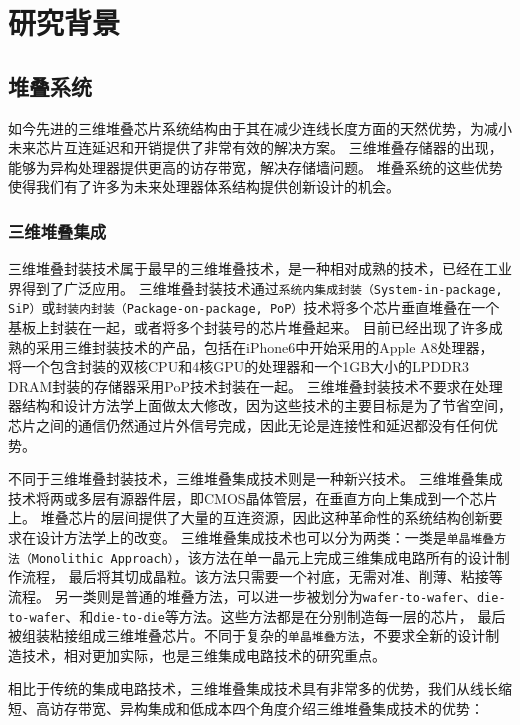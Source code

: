 \chapter{研究背景}
\label{chap:background}

\section{堆叠系统}

如今先进的三维堆叠芯片系统结构由于其在减少连线长度方面的天然优势，为减小未来芯片互连延迟和开销提供了非常有效的解决方案。
三维堆叠存储器的出现，能够为异构处理器提供更高的访存带宽，解决存储墙问题。
堆叠系统的这些优势使得我们有了许多为未来处理器体系结构提供创新设计的机会。

\subsection{三维堆叠集成}

三维堆叠封装技术属于最早的三维堆叠技术，是一种相对成熟的技术，已经在工业界得到了广泛应用。
三维堆叠封装技术通过\texttt{系统内集成封装（System-in-package, SiP）}或\texttt{封装内封装（Package-on-package, PoP）}技术将多个芯片垂直堆叠在一个基板上封装在一起，或者将多个封装号的芯片堆叠起来。
目前已经出现了许多成熟的采用三维封装技术的产品，包括在iPhone6中开始采用的Apple A8处理器，
将一个包含封装的双核CPU和4核GPU的处理器和一个1GB大小的LPDDR3 DRAM封装的存储器采用PoP技术封装在一起。
三维堆叠封装技术不要求在处理器结构和设计方法学上面做太大修改，因为这些技术的主要目标是为了节省空间，
芯片之间的通信仍然通过片外信号完成，因此无论是连接性和延迟都没有任何优势。

不同于三维堆叠封装技术，三维堆叠集成技术则是一种新兴技术。
三维堆叠集成技术将两或多层有源器件层，即CMOS晶体管层，在垂直方向上集成到一个芯片上。
堆叠芯片的层间提供了大量的互连资源，因此这种革命性的系统结构创新要求在设计方法学上的改变。
三维堆叠集成技术也可以分为两类：一类是\texttt{单晶堆叠方法（Monolithic Approach）}，该方法在单一晶元上完成三维集成电路所有的设计制作流程，
最后将其切成晶粒。该方法只需要一个衬底，无需对准、削薄、粘接等流程。
另一类则是普通的堆叠方法，可以进一步被划分为\texttt{wafer-to-wafer}、\texttt{die-to-wafer}、和\texttt{die-to-die}等方法。这些方法都是在分别制造每一层的芯片，
最后被组装粘接组成三维堆叠芯片。不同于复杂的\texttt{单晶堆叠方法}，不要求全新的设计制造技术，相对更加实际，也是三维集成电路技术的研究重点。


相比于传统的集成电路技术，三维堆叠集成技术具有非常多的优势，我们从线长缩短、高访存带宽、异构集成和低成本四个角度介绍三维堆叠集成技术的优势：

